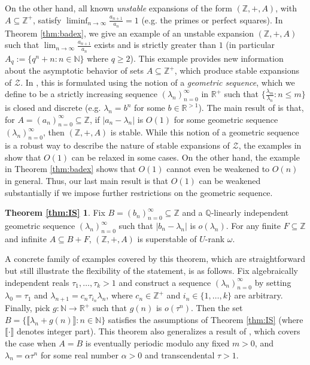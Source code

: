 \documentclass{amsart}
\def\seq{\subseteq}
\newcommand{\cZ}{\mathcal{Z}}
\def\N{\mathbb N}
\def\Q{\mathbb Q}
\def\R{\mathbb R}
\def\Z{\mathbb Z}
\theoremstyle{definition}
\begin{document}
On the other hand, all known \emph{unstable} expansions of the form $(\Z,+,A)$, with $A\seq\Z^+$, satisfy $\liminf_{n\to\infty}\frac{a_{n+1}}{a_n}=1$ (e.g. the primes or perfect squares). In Theorem \ref{thm:badex}, we give an example of an unstable expansion $(\Z,+,A)$ such that $\lim_{n\to\infty}\frac{a_{n+1}}{a_n}$ exists and is strictly greater than $1$ (in particular $A_q:=\{q^n+n:n\in\N\}$ where $q\geq 2$). This example provides new information about the asymptotic behavior of sets $A\seq\Z^+$, which produce stable expansions of $\cZ$. In \cite{CoSS}, this is formulated using the notion of a \emph{geometric sequence}, which we define to be a strictly increasing sequence $(\lambda_n)_{n=0}^\infty$ in $\R^+$ such that $\{\frac{\lambda_m}{\lambda_n}:n\leq m\}$ is closed and discrete (e.g. $\lambda_n=b^n$ for some $b\in\R^{>1}$). The main result of \cite{CoSS} is that, for $A=(a_n)_{n=0}^\infty\seq\Z$, if $|a_n-\lambda_n|$ is $O(1)$ for some geometric sequence $(\lambda_n)_{n=0}^\infty$, then $(\Z,+,A)$ is stable. While this notion of a geometric sequence is a robust way to describe the nature of stable expansions of $\cZ$, the examples in \cite{PoLa} show that $O(1)$ can be relaxed in some cases. On the other hand, the example in Theorem \ref{thm:badex} shows that $O(1)$ cannot even be weakened to $O(n)$ in general. Thus, our last main result is that $O(1)$ can be weakened substantially if we impose further restrictions on the geometric sequence.

\newtheorem*{thm:IS}{Theorem \ref{thm:IS}}
\begin{thm:IS}
Fix $B=(b_n)_{n=0}^\infty\seq\Z$ and a $\Q$-linearly independent geometric sequence $(\lambda_n)_{n=0}^\infty$ such that $|b_n-\lambda_n|$ is $o(\lambda_n)$. For any finite $F\seq\Z$ and infinite $A\seq B+F$, $(\Z,+,A)$ is superstable of $U$-rank $\omega$.
\end{thm:IS}

A concrete family of examples covered by this theorem, which are straightforward but still illustrate the flexibility of the statement, is as follows. Fix algebraically independent reals $\tau_1,\ldots,\tau_k>1$ and construct a sequence $(\lambda_n)_{n=0}^\infty$ by setting $\lambda_0=\tau_1$ and $\lambda_{n+1}=c_n\tau_{i_n}\lambda_n$, where $c_n\in\Z^+$ and $i_n\in\{1,\ldots,k\}$ are arbitrary. Finally, pick $g\colon \N\to\R^+$ such that $g(n)$ is $o(\tau^n)$. Then the set $B=\{\llbracket\lambda_n+g(n)\rrbracket:n\in\N\}$ satisfies the assumptions of Theorem \ref{thm:IS} (where $\llbracket\cdot\rrbracket$ denotes integer part).  This theorem also generalizes a result of \cite{PoLa}, which covers the case when $A=B$ is eventually periodic modulo any fixed $m>0$, and $\lambda_n=\alpha\tau^n$ for some real number $\alpha>0$ and transcendental $\tau>1$. 
\end{document}

